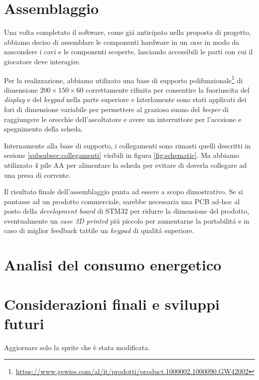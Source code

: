 \documentclass[a4paper]{article}
\begin{document}
\section{Assemblaggio}

Una volta completato il software, come gi\'a anticipato nella proposta di progetto, abbiamo deciso di assemblare le componenti hardware in un \textit{case} in modo da nascondere i cavi e le componenti scoperte, lasciando accessibili le parti con cui il giocatore deve interagire.

Per la realizzazione, abbiamo utilizato una base di supporto polifunzionale\footnote{\url{https://www.gewiss.com/al/it/prodotti/product.1000002.1000090.GW42002}} di dimensione $200 \times 150 \times 60$ correttamente rifinita per consentire la fuoriuscita del \textit{display} e del \textit{keypad} nella parte superiore e laterlamente sono stati applicati dei fori di dimensione variabile per permettere al grazioso suono del \textit{beeper} di raggiungere le orecchie dell'ascoltatore e avere un interruttore per l'accsione e spegnimento della scheda.

Internamente alla base di supporto, i collegamenti sono rimasti quelli descritti in sezione \ref{subsubsec:collegamenti} visibili in figura \ref{fig:schematic}. Ma abbiamo utilizzato 4 pile AA per alimentare la scheda per evitare di doverla collegare ad una presa di corrente.


Il risultato finale dell'assemblaggio punta ad essere a scopo dimostrativo. Se si puntasse ad un prodotto commerciale, sarebbe necessaria una PCB ad-hoc al posto della \textit{development board} di STM32 per ridurre la dimensione del prodotto, eventualmente un \textit{case 3D printed} pi\'u piccolo per aumentarne la portabilit\'a e in caso di miglior feedback tattile un \textit{keypad} di qualit\'a superiore.

\section{Analisi del consumo energetico}


\section{Considerazioni finali e sviluppi futuri}

Aggiornare solo la sprite che è stata modificata.



\end{document}
